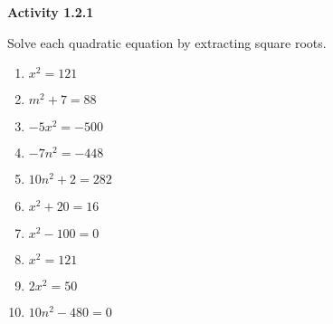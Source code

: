 \vspace{1ex}
\noindent\textbf{Activity 1.2.1}

\vspace{0.75ex}
 
Solve each quadratic equation by extracting square roots.
\begin{multicols}{3}
\begin{enumerate}[label = \color{blue}\arabic*. ]
  \item $ x^2 = 121 $
  \item $ m^2 + 7 = 88 $
  \item $ -5x^2 = -500 $
  \item $ -7n^2 = -448 $
  \item $ 10n^2 + 2 = 282 $
  \item $ x^2 + 20 = 16 $
  \item $ x^2 - 100 = 0 $
  \item $ x^2 = 121 $
  \item $ 2x^2 = 50 $
  \item $ 10n^2 - 480 = 0 $
\end{enumerate}
\end{multicols}
				
				
